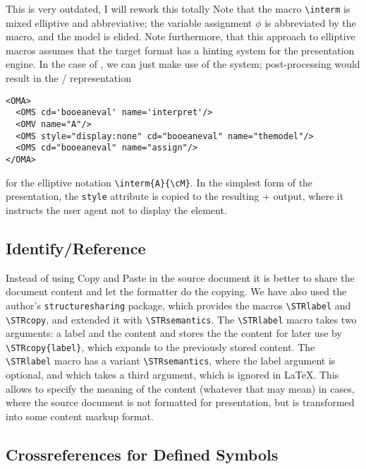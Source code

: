 \begin{oldpart}{This is very outdated, I will rework this totally}
Note that the macro {\verb|\interm|} is mixed elliptive and abbreviative; the
variable assignment $\phi$ is abbreviated by the macro, and the model is elided.
Note furthermore, that this approach to elliptive macros assumes that the target
format has a hinting system for the presentation engine. In the case of {\omdoc},
we can just make use of the {\css} system; {\latexml} post-processing would result
in the {\omdoc}/{\openmath} representation
\begin{footnotesize}
\begin{verbatim}
<OMA>
  <OMS cd='booeaneval' name='interpret'/>
  <OMV name="A"/>
  <OMS style="display:none" cd="booeaneval" name="themodel"/>
  <OMS cd="booeaneval" name="assign"/>
</OMA>
\end{verbatim}
\end{footnotesize}
for the elliptive notation {\verb|\interm{A}{\cM}|}. In the simplest form of the
{\omdoc} presentation, the {\css} {\tt{style}} attribute is copied to the
resulting {\xhtml}+{\mathml} output, where it instructs the user agent not to
display the element.

\subsection{Identify/Reference}

Instead of using Copy and Paste in the source document it is better to share the
document content and let the formatter do the copying. We have also used the
author's {\tt{structuresharing}} package, which provides the macros
{\verb|\STRlabel|} and {\verb|\STRcopy|}, and extended it with
{\verb|\STRsemantics|}.  The {\verb|\STRlabel|} macro takes two arguments: a label
and the content and stores the the content for later use by
{\verb|\STRcopy{label}|}, which expands to the previously stored content.  The
{\verb|\STRlabel|} macro has a variant {\verb|\STRsemantics|}, where the label
argument is optional, and which takes a third argument, which is ignored in LaTeX.
This allows to specify the meaning of the content (whatever that may mean) in
cases, where the source document is not formatted for presentation, but is
transformed into some content markup format.

\subsection{Crossreferences for Defined Symbols}


\end{oldpart}

